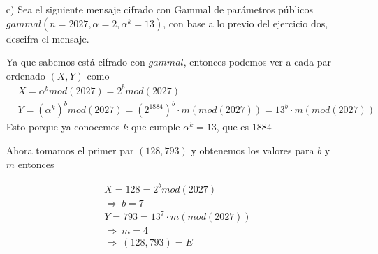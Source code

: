 \documentclass[12pt, letterpaper]{article}
\begin{document}
\begin{itemize}
\item[c)] Sea el siguiente mensaje cifrado con Gammal de parámetros públicos $gammal(n = 2027, \alpha = 2, \alpha^k = 13)$, con base a lo previo del ejercicio dos, descifra el mensaje.

Ya que sabemos está cifrado con $gammal$, entonces podemos ver a cada par ordenado $(X, Y)$ como
\begin{equation*}
\begin{split}
&X = \alpha^b mod (2027) = 2^b mod (2027)\\
&Y = (\alpha^k)^b mod (2027) = (2^{1884})^b\cdot m (mod (2027)) = 13^b\cdot m (mod (2027))
\end{split}
\end{equation*}
Esto porque ya conocemos $k$ que cumple $\alpha^k = 13$, que es $1884$

Ahora tomamos el primer par $(128, 793)$ y obtenemos los valores para $b$ y $m$ entonces

\begin{equation*}
\begin{split}
&X = 128 = 2^b mod (2027)\\
&\Rightarrow\ b = 7\\
&Y = 793 = 13^7\cdot m (mod (2027))\\
&\Rightarrow\ m = 4\\
&\Rightarrow\ (128, 793) = E
\end{split}
\end{equation*}


\end{itemize}
\end{document}
